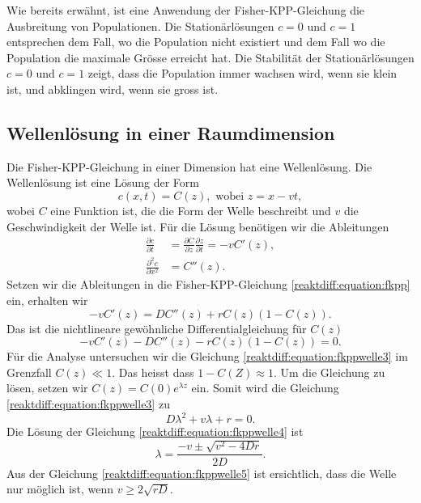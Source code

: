 Wie bereits erwähnt, ist eine Anwendung der Fisher-KPP-Gleichung die Ausbreitung von Populationen.
Die Stationärlösungen \(c = 0\) und \(c = 1\) entsprechen dem Fall, wo die Population nicht existiert und dem Fall wo die Population die maximale Grösse erreicht hat.
Die Stabilität der Stationärlösungen \(c = 0\) und \(c = 1\) zeigt, dass die Population immer wachsen wird, wenn sie klein ist, und abklingen wird, wenn sie gross ist.

\subsection{Wellenlösung in einer Raumdimension
\label{reaktdiff:subsection:fkppwelle}}
Die Fisher-KPP-Gleichung in einer Dimension hat eine Wellenlösung.
Die Wellenlösung ist eine Lösung der Form
\begin{equation*}
\label{reaktdiff:equation:fkppwelle}
c(x,t) = C(z), \text{ wobei } z = x - vt,
\end{equation*}
wobei \(C\) eine Funktion ist, die die Form der Welle beschreibt und \(v\) die Geschwindigkeit der Welle ist.
Für die Lösung benötigen wir die Ableitungen
\begin{align*}
\frac{\partial c}{\partial t} &= \frac{\partial C}{\partial z}\frac{\partial z}{\partial t} = -vC'(z),
\\
\frac{\partial^2 c}{\partial x^2} &= C''(z).
\end{align*}
Setzen wir die Ableitungen in die Fisher-KPP-Gleichung \eqref{reaktdiff:equation:fkpp} ein, erhalten wir
\begin{equation*}
\label{reaktdiff:equation:fkppwelle2}
-vC'(z) = D C''(z) + rC(z)(1-C(z)).
\end{equation*}
Das ist die nichtlineare gewöhnliche Differentialgleichung für \(C(z)\)
\begin{equation}
    \label{reaktdiff:equation:fkppwelle3}
    -vC'(z) - D C''(z) - rC(z)(1-C(z)) = 0.
\end{equation}
Für die Analyse untersuchen wir die Gleichung \eqref{reaktdiff:equation:fkppwelle3} im Grenzfall \(C(z) \ll 1\).
Das heisst dass \(1 - C(Z)\approx 1\).
Um die Gleichung zu lösen, setzen wir \(C(z) = C(0) e^{\lambda z}\) ein.
Somit wird die Gleichung \eqref{reaktdiff:equation:fkppwelle3} zu
\begin{equation}
\label{reaktdiff:equation:fkppwelle4}
D\lambda^2 + v\lambda + r = 0.
\end{equation}
Die Lösung der Gleichung \eqref{reaktdiff:equation:fkppwelle4} ist
\begin{equation}
\label{reaktdiff:equation:fkppwelle5}
\lambda = \frac{-v \pm \sqrt{v^2 - 4Dr}}{2D}.
\end{equation}
Aus der Gleichung \eqref{reaktdiff:equation:fkppwelle5} ist ersichtlich, dass die Welle nur möglich ist, wenn \(v \ge 2\sqrt{rD}\).

